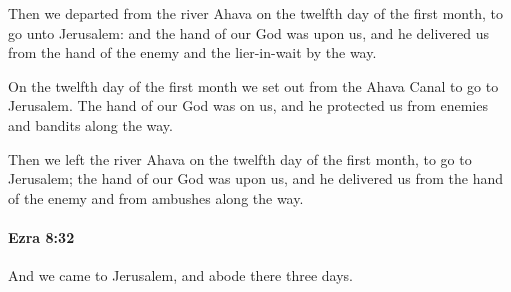 			\begin{versebox}
					\item[BHS] 
					\item[LXX] 
					\item[ASV] Then we departed from the river Ahava on the twelfth day of the first month, to go unto Jerusalem: and the hand of our God was upon us, and he delivered us from the hand of the enemy and the lier-in-wait by the way.
					\item[NIV] On the twelfth day of the first month we set out from the Ahava Canal to go to Jerusalem. The hand of our God was on us, and he protected us from enemies and bandits along the way.
					\item[NRSV] Then we left the river Ahava on the twelfth day of the first month, to go to Jerusalem; the hand of our God was upon us, and he delivered us from the hand of the enemy and from ambushes along the way.
			\end{versebox}

		\paragraph{Ezra 8:32} %
			\label{EZRA-8-32}

			And we came to Jerusalem, and abode there three days.

